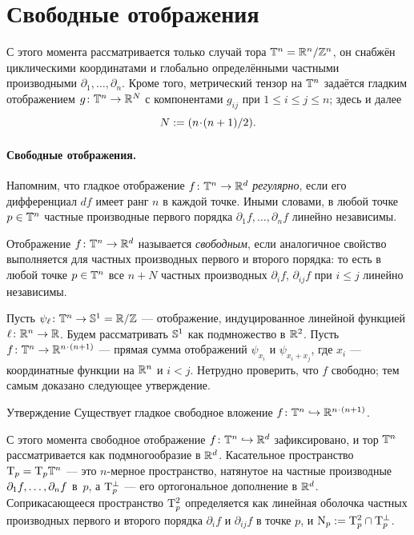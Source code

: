 \section{Свободные отображения}\label{sec:free}

С этого момента рассматривается только случай тора $\TT^n\z=\RR^n/\ZZ^n$, он снабжён циклическими координатами и глобально определёнными частными производными $\partial_1,\dots,\partial_n$.
Кроме того, метрический тензор на $\mathbb{T}^n$ задаётся гладким отображением $g\colon\TT^n\z\to\RR^N$ с компонентами $g_{ij}$ при $1\le i\le j\le n$; здесь и далее \label{Nn}
\[N\df\tfrac{n\cdot(n+1)}2.\]

\paragraph{Свободные отображения.}
Напомним, что гладкое отображение $f\colon\mathbb{T}^n \to \mathbb{R}^d$ \emph{регулярно}, если его дифференциал $df$ имеет ранг $n$ в каждой точке.
Иными словами, в любой точке $p\in \mathbb{T}^n$ частные производные первого порядка $\partial_1 f,\dots,\partial_n f$ линейно независимы.

Отображение $f\colon\mathbb{T}^n \to \mathbb{R}^d$ называется \emph{свободным}, если аналогичное свойство выполняется для частных производных первого и второго порядка:
то есть в любой точке $p\in \mathbb{T}^n$ все $n + N$ частных производных
$\partial_i f$,
$\partial_{ij}f$ при $i\le j$
линейно независимы.

Пусть $\psi_\ell\colon\mathbb{T}^n\to\mathbb{S}^1=\mathbb{R}/\mathbb{Z}$ --- отображение, индуцированное линейной функцией $\ell\colon\mathbb{R}^n\to\mathbb{R}$.
Будем рассматривать $\mathbb{S}^1$ как подмножество в $\mathbb{R}^2$.
Пусть $f\colon\TT^n\z\to \RR^{n\cdot(n+1)}$ --- прямая сумма отображений
$\psi_{x_i}$ и $\psi_{x_i+x_j}$, где $x_i$ --- координатные функции на $\mathbb{R}^n$ и $i<j$.
Нетрудно проверить, что $f$ свободно; тем самым доказано следующее утверждение.

\begin{thm}{Утверждение}\label{ex:free-composition}
Существует гладкое свободное вложение $f\colon\TT^n\hookrightarrow \RR^{n\cdot(n+1)}$.
\end{thm}

С этого момента свободное отображение $f\colon\mathbb{T}^n\hookrightarrow \mathbb{R}^d$\label{f} зафиксировано, и
тор $\mathbb{T}^n$ рассматривается как подмногообразие в $\mathbb{R}^d$.
Касательное пространство $\mathrm{T}_p=\mathrm{T}_p\mathbb{T}^n$ --- это $n$-мерное пространство, натянутое на частные производные $\partial_1f,\z\dots, \partial_nf$ в~$p$, а $\mathrm{T}_p^\perp$ --- его ортогональное дополнение в $\mathbb{R}^d$.
Соприкасающееся пространство $\mathrm{T}^2_p$ определяется как линейная оболочка частных производных первого и второго порядка $\partial_i f$ и $\partial_{ij} f$ в точке $p$, и $\N_p \z\df \T^2_p \cap \T_p^\perp$.

